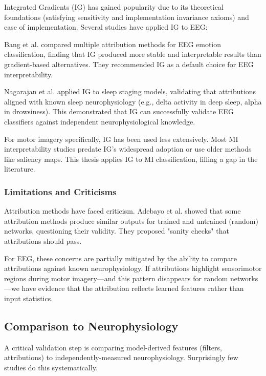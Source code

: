 Integrated Gradients (IG) \cite{sundararajan2017axiomatic} has gained popularity due to its theoretical foundations (satisfying sensitivity and implementation invariance axioms) and ease of implementation. Several studies have applied IG to EEG:

Bang et al. \cite{bang2021spatio} compared multiple attribution methods for EEG emotion classification, finding that IG produced more stable and interpretable results than gradient-based alternatives. They recommended IG as a default choice for EEG interpretability.

Nagarajan et al. applied IG to sleep staging models, validating that attributions aligned with known sleep neurophysiology (e.g., delta activity in deep sleep, alpha in drowsiness). This demonstrated that IG can successfully validate EEG classifiers against independent neurophysiological knowledge.

For motor imagery specifically, IG has been used less extensively. Most MI interpretability studies predate IG's widespread adoption or use older methods like saliency maps. This thesis applies IG to MI classification, filling a gap in the literature.

\subsubsection{Limitations and Criticisms}

Attribution methods have faced criticism. Adebayo et al. \cite{adebayo2018sanity} showed that some attribution methods produce similar outputs for trained and untrained (random) networks, questioning their validity. They proposed "sanity checks" that attributions should pass.

For EEG, these concerns are partially mitigated by the ability to compare attributions against known neurophysiology. If attributions highlight sensorimotor regions during motor imagery—and this pattern disappears for random networks—we have evidence that the attribution reflects learned features rather than input statistics.


\subsection{Comparison to Neurophysiology}
\label{subsec:rw_neuro_comparison}

A critical validation step is comparing model-derived features (filters, attributions) to independently-measured neurophysiology. Surprisingly few studies do this systematically.

